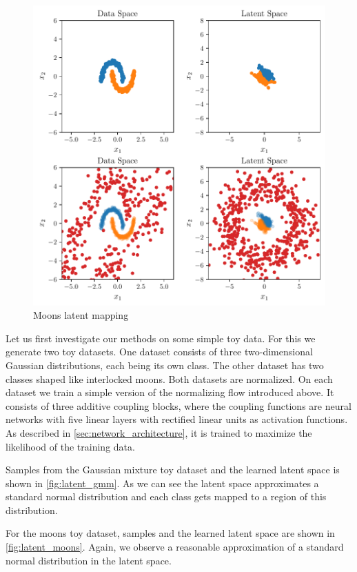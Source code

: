 \begin{figure}[htpb]
	\centering
        \includegraphics{figures/toy_example/moons/latent_mapping.pdf}
	\caption{Moons latent mapping}%
	\label{fig:latent_moons}
\end{figure}

Let us first investigate our methods on some simple toy data. For this we
generate two toy datasets. One dataset consists of three two-dimensional
Gaussian distributions, each being its own class. The other dataset has two
classes shaped like interlocked moons. Both datasets are normalized. On each
dataset we train a simple version of the normalizing flow introduced above. It
consists of three additive coupling blocks, where the coupling
functions are neural networks with five linear layers with rectified linear
units as activation functions. As described in
\autoref{sec:network_architecture}, it is trained to maximize the likelihood of
the training data.

Samples from the Gaussian mixture toy dataset and the learned latent space
is shown in \autoref{fig:latent_gmm}. As we can see
the latent space approximates a standard normal distribution and each class
gets mapped to a region of this distribution.

For the moons toy dataset, samples and the learned latent space are shown in
\autoref{fig:latent_moons}. Again, we observe a reasonable approximation
of a standard normal distribution in the latent space.

